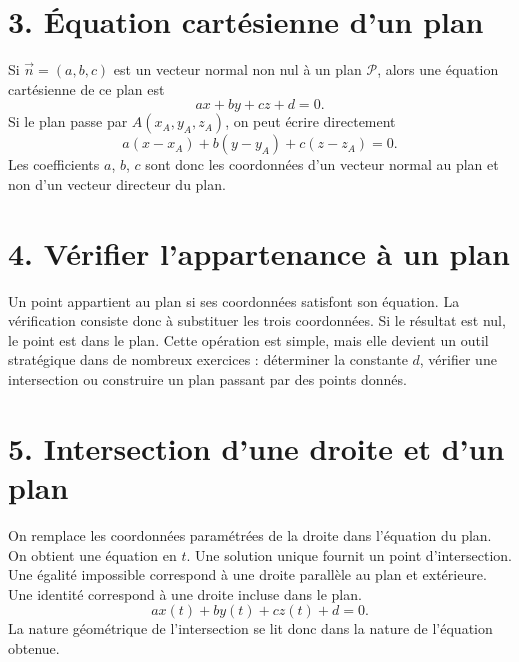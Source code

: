 
\section{3. Équation cartésienne d’un plan}
Si $\vec n=(a,b,c)$ est un vecteur normal non nul à un plan $\mathcal P$, alors une équation cartésienne de ce plan est
\[
ax+by+cz+d=0.
\]
Si le plan passe par $A(x_A,y_A,z_A)$, on peut écrire directement
\[
a(x-x_A)+b(y-y_A)+c(z-z_A)=0.
\]
Les coefficients $a$, $b$, $c$ sont donc les coordonnées d'un vecteur normal au plan et non d'un vecteur directeur du plan.

\section{4. Vérifier l’appartenance à un plan}
Un point appartient au plan si ses coordonnées satisfont son équation. La vérification consiste donc à substituer les trois coordonnées. Si le résultat est nul, le point est dans le plan. Cette opération est simple, mais elle devient un outil stratégique dans de nombreux exercices : déterminer la constante $d$, vérifier une intersection ou construire un plan passant par des points donnés.

\section{5. Intersection d’une droite et d’un plan}
On remplace les coordonnées paramétrées de la droite dans l'équation du plan. On obtient une équation en $t$. Une solution unique fournit un point d'intersection. Une égalité impossible correspond à une droite parallèle au plan et extérieure. Une identité correspond à une droite incluse dans le plan.
\[
ax(t)+by(t)+cz(t)+d=0.
\]
La nature géométrique de l'intersection se lit donc dans la nature de l'équation obtenue.



